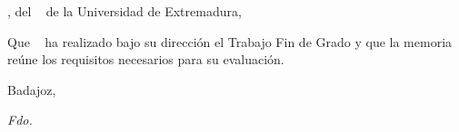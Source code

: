 \thispagestyle{empty}
\vspace*{-1cm}
\noindent \tacademico,  del
\departamentotutor~ de la Universidad de Extremadura, 

\vspace{0.5cm}	
\noindent {}
\vspace{0.5cm}

\noindent Que  \estudiante~
ha realizado bajo su direcci\'on el Trabajo Fin de Grado y  que la memoria re\'une los requisitos necesarios para su evaluaci\'on.

\vspace{2cm}
\begin{flushright} Badajoz, \fecha \end{flushright}
\vspace{4cm}

\hspace*{-2cm}
\begin{minipage}[t]{0.7\textwidth}
\noindent \emph{Fdo. \tacademico}\\
\end{minipage}
\hspace*{1cm}

